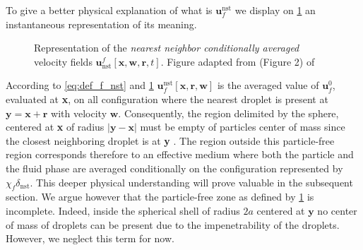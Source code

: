 To give a better physical explanation of what is $\textbf{u}_f^\text{nst}$ we display on \ref{fig:unst} an instantaneous representation of its meaning. 
\begin{figure}[h!]
    \centering
{} 
\caption{Representation of the \textit{nearest neighbor conditionally averaged} velocity fields $\textbf{u}_\text{nst}^f[\textbf{x},\textbf{w},\textbf{r},t]$.
Figure adapted from (Figure 2) of \citet{zhang2021ensemble}}
\label{fig:unst}
\end{figure}
According to \ref{eq:def_f_nst} and \ref{fig:unst} $\textbf{u}_f^\text{nst}[\textbf{x},\textbf{r},\textbf{w}]$ is the averaged value of $\textbf{u}_f^0$, evaluated at \textbf{x}, on all configuration where the nearest droplet is present at $\textbf{y} = \textbf{x} + \textbf{r}$ with velocity $\textbf{w}$. 
Consequently, the region delimited by the sphere, centered at \textbf{x} of radius $|\textbf{y} - \textbf{x}|$ must be empty of particles center of mass since the closest neighboring droplet is at \textbf{y} \citep{zhang2021ensemble}. 
The region outside this particle-free region corresponds therefore to an effective medium where both the particle and the fluid phase are averaged conditionally on the configuration represented by $\chi_f\delta_\text{nst}$. 
This deeper physical understanding will prove valuable in the subsequent section.  
We argue however that the particle-free zone as defined by \ref{fig:unst} is incomplete. 
Indeed, inside the spherical shell of radius $2a$ centered at $\textbf{y}$ no center of mass of droplets can be present due to the impenetrability of the droplets. 
However, we neglect this term for now. 


